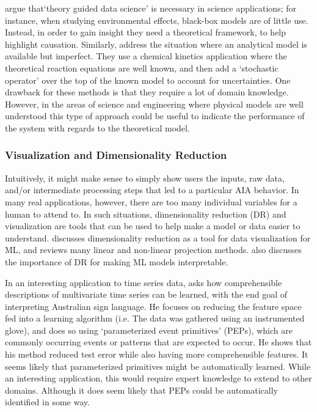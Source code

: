     \citet{Faghmous2014-og} argue that`theory guided data science' is necessary in science applications; for instance, when studying environmental effects, black-box models are of little use. Instead, in order to gain insight they need a theoretical framework, to help highlight causation. Similarly, \citet{Morrison2016-fz} address the situation where an analytical model is available but imperfect. They use a chemical kinetics application where the theoretical reaction equations are well known, and then add a `stochastic operator' over the top of the known model to account for uncertainties. One drawback for these methods is that they require a lot of domain knowledge. However, in the areas of science and engineering where physical models are well understood this type of approach could be useful to indicate the performance of the system with regards to the theoretical model.

\subsubsection{Visualization and Dimensionality Reduction}
    Intuitively, it might make sense to simply show users the inputs, raw data, and/or intermediate processing steps that led to a particular AIA behavior. In many real applications, however, there are too many individual variables for a human to attend to. In such situations, dimensionality reduction (DR) and visualization are tools that can be used to help make a model or data easier to understand. \citet{Venna2007-yj} discusses dimensionality reduction as a tool for data visualization for ML, and reviews many linear and non-linear projection methods. \citet{Vellido2012-nm} also discusses the importance of DR for making ML models interpretable.

    In an interesting application to time series data, \citet{Kadous1999-rx} asks how comprehensible descriptions of multivariate time series can be learned, with the end goal of interpreting Australian sign language. He focuses on reducing the feature space fed into a learning algorithm (i.e. The data was gathered using an instrumented glove), and does so using `parameterized event primitives' (PEPs), which are commonly occurring events or patterns that are expected to occur. He shows that his method reduced test error while also having more comprehensible features. It seems likely that parameterized primitives might be automatically learned. While an interesting application, this would require expert knowledge to extend to other domains. Although it does seem likely that PEPs could be automatically identified in some way.

